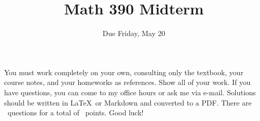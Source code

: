 \documentclass{exam}
\title{Math 390 Midterm}
\author{Due Friday, May 20}
\date{}
\begin{document}

\maketitle

\setlength{\parindent}{0em} %
\setlength{\parskip}{1em} %


You must work completely on your own, consulting only the textbook, your course notes, and your homeworks as references. Show all of your work. If you have questions, you can come to my office hours or ask me via e-mail. Solutions should be written in \LaTeX\ or Markdown and converted to a PDF. There are \numquestions\ questions for a total of \numpoints\ points. Good luck!
\end{document}
